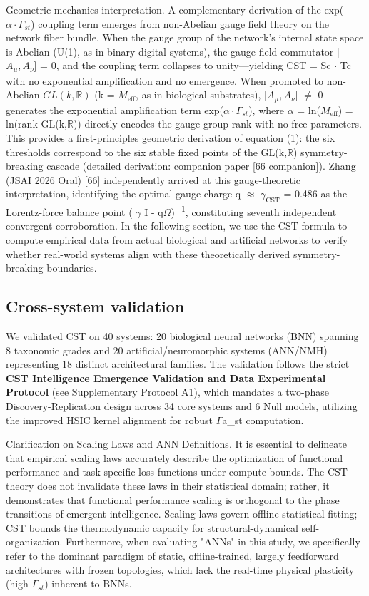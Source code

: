 \documentclass[a4paper,12pt]{article}
\begin{document}
Geometric mechanics interpretation.
A complementary derivation of the exp($\alpha \cdot \Gamma_{st}$) coupling term emerges from non-Abelian gauge field theory on the network fiber bundle.
When the gauge group of the network's internal state space is Abelian (U(1), as in binary-digital systems), the gauge field commutator [$A_{\mu}, A_{\nu}$] = 0, and the coupling term collapses to unity---yielding CST = Sc $\cdot$ Tc with no exponential amplification and no emergence.
When promoted to non-Abelian $GL(k, \mathbb{R})$ (k = $M_{\text{eff}}$, as in biological substrates), [$A_{\mu}, A_{\nu}$]  $\neq$  0 generates the exponential amplification term exp($\alpha \cdot \Gamma_{st}$), where  $\alpha$  = ln($M_{\text{eff}}$) = ln(rank GL(k,$\mathbb{R}$)) directly encodes the gauge group rank with no free parameters.
This provides a first-principles geometric derivation of equation (1): the six thresholds correspond to the six stable fixed points of the GL(k,$\mathbb{R}$) symmetry-breaking cascade (detailed derivation: companion paper [66 companion]).
Zhang (JSAI 2026 Oral) [66] independently arrived at this gauge-theoretic interpretation, identifying the optimal gauge charge q  $\approx$  $\gamma_{\text{CST}}$ = 0.486 as the Lorentz-force balance point ( $\gamma$ I - q$\Omega$)\textsuperscript{$-$}\textsuperscript{1}, constituting seventh independent convergent corroboration.
In the following section, we use the CST formula to compute empirical data from actual biological and artificial networks to verify whether real-world systems align with these theoretically derived symmetry-breaking boundaries.

\subsection{Cross-system validation}

We validated CST on 40 systems: 20 biological neural networks (BNN) spanning 8 taxonomic grades and 20 artificial/neuromorphic systems (ANN/NMH) representing 18 distinct architectural families.
The validation follows the strict \textbf{CST Intelligence Emergence Validation and Data Experimental Protocol} (see Supplementary Protocol A1), which mandates a two-phase Discovery-Replication design across 34 core systems and 6 Null models, utilizing the improved HSIC kernel alignment for robust $\Gamma$a_{st} computation.

Clarification on Scaling Laws and ANN Definitions.
It is essential to delineate that empirical scaling laws accurately describe the optimization of functional performance and task-specific loss functions under compute bounds.
The CST theory does not invalidate these laws in their statistical domain; rather, it demonstrates that functional performance scaling is orthogonal to the phase transitions of emergent intelligence.
Scaling laws govern offline statistical fitting; CST bounds the thermodynamic capacity for structural-dynamical self-organization.
Furthermore, when evaluating "ANNs" in this study, we specifically refer to the dominant paradigm of static, offline-trained, largely feedforward architectures with frozen topologies, which lack the real-time physical plasticity (high $\Gamma_{st}$) inherent to BNNs.
\end{document}
